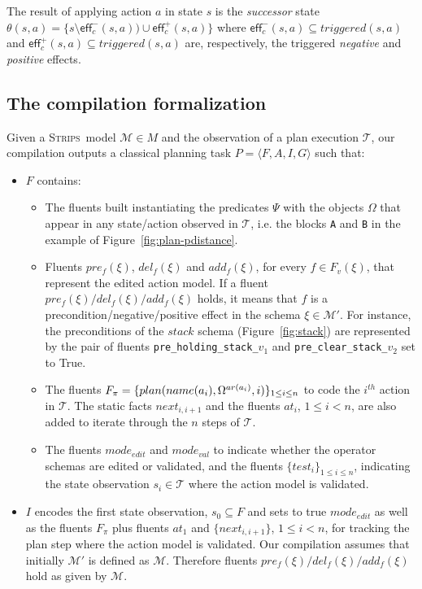 \documentclass[letterpaper]{article} %
\newcommand{\tup}[1]{{\langle #1 \rangle}}
\newcommand{\eff}{\mathsf{eff}}     %
\newcommand{\strips}{\textsc{Strips}}     %
\begin{document}
The result of applying action $a$ in state $s$ is the {\em successor} state $\theta(s,a)=\{s\setminus\eff_c^-(s,a))\cup\eff_c^+(s,a)\}$ where $\eff_c^-(s,a)\subseteq triggered(s,a)$ and $\eff_c^+(s,a)\subseteq triggered(s,a)$ are, respectively, the triggered {\em negative} and {\em positive} effects.


\subsection{The compilation formalization}
Given a \strips\ model $\mathcal{M}\in M$ and the observation of a plan execution $\mathcal{T}$, our compilation outputs a classical planning task $P=\tup{F,A,I,G}$ such that:
\begin{itemize}
\item $F$ contains:
\begin{itemize}
\item The fluents built instantiating the predicates $\Psi$ with the objects $\Omega$ that appear in any state/action observed in $\mathcal{T}$, i.e. the blocks {\tt\small A} and {\tt\small B} in the example of Figure~\ref{fig:plan-pdistance}. 
\item Fluents $pre_f(\xi)$, $del_f(\xi)$ and $add_f(\xi)$, for every $f\in F_v(\xi)$, that represent the edited action model. If a fluent $pre_f(\xi)/del_f(\xi)/add_f(\xi)$ holds, it means that $f$ is a precondition/negative/positive effect in the schema $\xi\in \mathcal{M}'$. For instance, the preconditions of the $stack$ schema (Figure~\ref{fig:stack}) are represented by the pair of fluents {\small\tt pre\_holding\_stack\_$v_1$} and {\small\tt pre\_clear\_stack\_$v_2$} set to True.
\item The fluents $F_{\pi}=\{plan(name(a_i),\Omega^{ar(a_i)},i)\}_{\small 1\leq i\leq n}$ to code the $i^{th}$ action in $\mathcal{T}$. The static facts $next_{i,i+1}$ and the fluents $at_i$, {\small $1\leq i< n$}, are also added to iterate through the $n$ steps of $\mathcal{T}$.
\item The fluents $mode_{edit}$ and $mode_{val}$ to indicate whether the operator schemas are edited or validated, and the fluents $\{test_i\}_{1\leq i\leq n}$, indicating the state observation $s_i\in\mathcal{T}$ where the action model is validated.
\end{itemize}
\item $I$ encodes the first state observation, $s_0\subseteq F$ and sets to true $mode_{edit}$ as well as the fluents $F_{\pi}$ plus fluents $at_1$ and $\{next_{i,i+1}\}$, {\small $1\leq i<n$}, for tracking the plan step where the action model is validated. Our compilation assumes that initially $\mathcal{M}'$ is defined as $\mathcal{M}$. Therefore fluents $pre_f(\xi)/del_f(\xi)/add_f(\xi)$ hold as given by $\mathcal{M}$.


\end{itemize}
\end{document}
